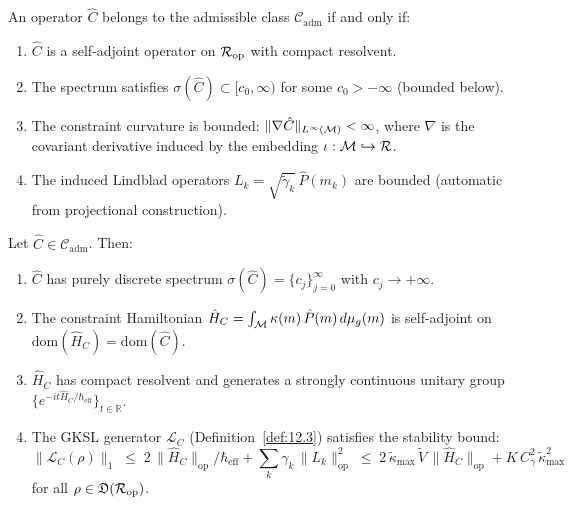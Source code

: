 \begin{definition}\label{def:12.6}
An operator $\hat{C}$ belongs to the admissible class
$\mathcal{C}_{\mathrm{adm}}$ if and only if:
\begin{enumerate}
  \item $\hat{C}$ is a self-adjoint operator on $\mathcal{R}_{\mathrm{op}}$ with
    compact resolvent.
  \item The spectrum satisfies $\sigma(\hat{C}) \subset [c_0, \infty)$
    for some $c_0 > -\infty$ (bounded below).
  \item The constraint curvature is bounded:
    $\|\nabla \hat{C}\|_{L^\infty(\mathcal{M})} < \infty$, where $\nabla$ is the
    covariant derivative induced by the embedding
    $\iota: \mathcal{M} \hookrightarrow \mathcal{R}$.
  \item The induced Lindblad operators $L_k = \sqrt{\tilde{\gamma}_k}\,\hat{P}(m_k)$
    are bounded (automatic from projectional construction).
\end{enumerate}
\end{definition}

\begin{theorem}\label{thm:12.3}
Let $\hat{C} \in \mathcal{C}_{\mathrm{adm}}$.  Then:
\begin{enumerate}
  \item $\hat{C}$ has purely discrete spectrum
    $\sigma(\hat{C}) = \{c_j\}_{j=0}^\infty$ with $c_j \to +\infty$.
  \item The constraint Hamiltonian
    $\hat{H}_C = \int_{\mathcal{M}} \kappa(m)\,\hat{P}(m)\,d\mu_g(m)$
    is self-adjoint on $\mathrm{dom}(\hat{H}_C) = \mathrm{dom}(\hat{C})$.
  \item $\hat{H}_C$ has compact resolvent and generates a strongly
    continuous unitary group $\{e^{-it\hat{H}_C/\hbar_{\mathrm{eff}}}\}_{t \in \mathbb{R}}$.
  \item The GKSL generator $\mathcal{L}_C$ (Definition~\ref{def:12.3})
    satisfies the stability bound:
    \begin{equation}\label{eq:stability}
      \|\mathcal{L}_C(\rho)\|_1 \;\leq\;
      2\,\|\hat{H}_C\|_{\mathrm{op}} / \hbar_{\mathrm{eff}}
      + \sum_k \gamma_k\,\|L_k\|_{\mathrm{op}}^2
      \;\leq\;
      2\,\tilde{\kappa}_{\max}\,\tilde{V}\,\|\hat{H}_C\|_{\mathrm{op}}
      + K\,C_\gamma^2\,\tilde{\kappa}_{\max}^2
    \end{equation}
    for all $\rho \in \mathfrak{D}(\mathcal{R}_{\mathrm{op}})$.
\end{enumerate}
\end{theorem}


